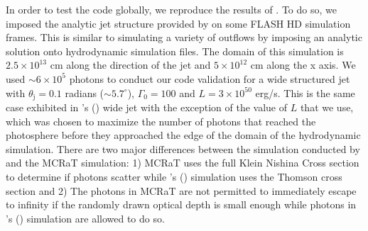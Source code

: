 \documentclass[12pt,a4paper]{article}
\begin{document}
In order to test the code globally, we reproduce the results of \cite{lundman2014polarization}. To do so, we imposed the analytic jet structure provided by \cite{lundman2014polarization} on some FLASH HD simulation frames. This is similar to \cite{MCRaT} simulating a variety of outflows by imposing an analytic solution onto hydrodynamic simulation files. {The domain of this simulation is $2.5 \times 10^{13}$ cm along the direction of the jet and $5 \times 10^{12}$ cm along the x axis.} We used $\sim 6 \times 10^5$ photons to conduct our code validation for a wide structured jet with $\theta_{\mathrm{j}}=0.1$ radians ($\sim 5.7^\circ$), $\Gamma_0=100$ and $L=3 \times 10^{50}$ erg/s. This is the same case exhibited in \citeauthor{lundman2014polarization}'s (\citeyear{lundman2014polarization}) wide jet with the exception of the value of $L$ that we use, which was chosen to maximize the number of photons that reached the photosphere before they approached the edge of the domain of the hydrodynamic simulation. {There are two major differences between the simulation conducted by \cite{lundman2014polarization} and the MCRaT simulation: 1) MCRaT uses the full Klein Nishina Cross section to determine if photons scatter while \citeauthor{lundman2014polarization}'s (\citeyear{lundman2014polarization}) simulation  uses the Thomson cross section and 2) The photons in MCRaT are not permitted to immediately escape to infinity if the randomly drawn optical depth is small enough while photons in  \citeauthor{lundman2014polarization}'s (\citeyear{lundman2014polarization}) simulation are allowed to do so. }
\end{document}
